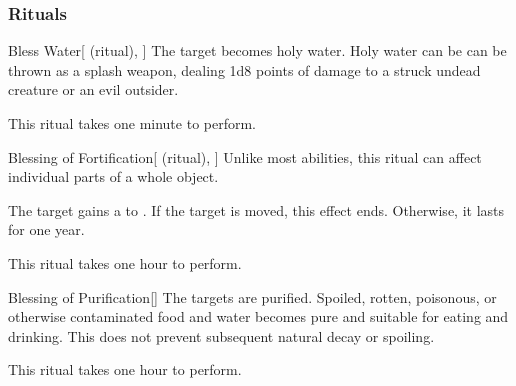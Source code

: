 \subsubsection{Rituals}


\lowercase{\hypertarget{spell:Bless Water}{}}\label{spell:Bless Water}
\begin{attuneability}[\nth{1}]{\hypertarget{spell:Bless Water}{Bless Water}}[ (ritual), ]
The target becomes holy water.
Holy water can be can be thrown as a splash weapon, dealing 1d8 points of damage to a struck undead creature or an evil outsider.

This ritual takes one minute to perform.
\end{attuneability}
\vspace{0.25em}



\lowercase{\hypertarget{spell:Blessing of Fortification}{}}\label{spell:Blessing of Fortification}
\begin{attuneability}[\nth{1}]{\hypertarget{spell:Blessing of Fortification}{Blessing of Fortification}}[ (ritual), ]
Unlike most abilities, this ritual can affect individual parts of a whole object.

The target gains a   to .
If the target is moved, this effect ends.
Otherwise, it lasts for one year.

This ritual takes one hour to perform.
\end{attuneability}
\vspace{0.25em}



\lowercase{\hypertarget{spell:Blessing of Purification}{}}\label{spell:Blessing of Purification}
\begin{apability}[\nth{1}]{\hypertarget{spell:Blessing of Purification}{Blessing of Purification}}[]
The targets are purified.
Spoiled, rotten, poisonous, or otherwise contaminated food and water becomes pure and suitable for eating and drinking.
This does not prevent subsequent natural decay or spoiling.

This ritual takes one hour to perform.
\end{apability}
\vspace{0.25em}



